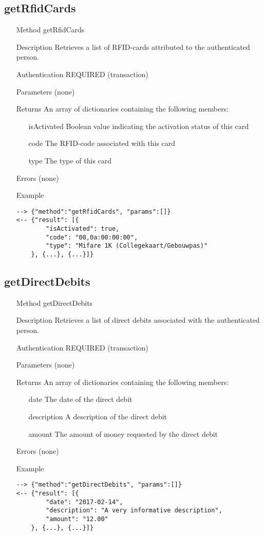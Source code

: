 \documentclass[a4paper]{scrreprt}
\begin{document}
\subsection{getRfidCards}
\begin{enumerate}
\item[Method] getRfidCards
\item[Description] Retrieves a list of RFID-cards attributed to the authenticated person.
\item[Authentication] REQUIRED (transaction)
\item[Parameters] (none)
\item[Returns] An array of dictionaries containing the following members:
\begin{enumerate}
    \item[isActivated] Boolean value indicating the activation status of this card
    \item[code] The RFID-code associated with this card
    \item[type] The type of this card
	\end{enumerate}
\item[Errors] (none)
\item[Example]
\begin{lstlisting}
--> {"method":"getRfidCards", "params":[]}
<-- {"result": [{
        "isActivated": true,
        "code": "00,0a:00:00:00",
        "type": "Mifare 1K (Collegekaart/Gebouwpas)"
    }, {...}, {...}]}
\end{lstlisting}
\end{enumerate}


\subsection{getDirectDebits}
\begin{enumerate}
\item[Method] getDirectDebits
\item[Description] Retrieves a list of direct debits associated with the authenticated person.
\item[Authentication] REQUIRED (transaction)
\item[Parameters] (none)
\item[Returns] An array of dictionaries containing the following members:
\begin{enumerate}
    \item[date] The date of the direct debit
    \item[description] A description of the direct debit
    \item[amount] The amount of money requested by the direct debit
	\end{enumerate}
\item[Errors] (none)
\item[Example]
\begin{lstlisting}
--> {"method":"getDirectDebits", "params":[]}
<-- {"result": [{
        "date": "2017-02-14",
        "description": "A very informative description",
        "amount": "12.00"
    }, {...}, {...}]}
\end{lstlisting}
\end{enumerate}
\end{document}
